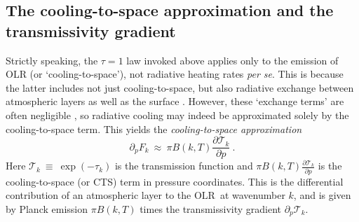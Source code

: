 \documentclass{ametsoc}
\newcommand{\beqn}{\begin{equation}}
\newcommand{\eeqn}{\end{equation}}
\newcommand{\eqnref}[1]{(\ref{#1})}
\newcommand{\partialder}[2]{\ensuremath{\frac{\partial #1}{\partial #2}}}
\newcommand{\ppp}{\ensuremath{\partial_p}}
\newcommand{\cotwo}{\ensuremath{\mathrm{CO_2}}}
\newcommand{\htwo}{\ensuremath{\mathrm{H_2O}}}
\newcommand{\OLR}{\ensuremath{\mathrm{OLR}}}
\newcommand{\trans}{\ensuremath{\mathcal{T}}}
\newcommand{\tauk}{\ensuremath{\tau_k}}
\newcommand{\taumax}{\ensuremath{\tau_{\text{max}}}}
\begin{document}
\subsection{The cooling-to-space approximation and the transmissivity gradient} \label{sec_tau=1}
Strictly speaking, the $\tau=1$ law  invoked above  applies only to the emission of OLR (or `cooling-to-space'), not radiative heating rates \emph{per se}. This is because  the latter includes not just cooling-to-space, but also radiative exchange between atmospheric layers as well as the surface \citep{green1967}. However,  these `exchange terms' are often negligible \citep{jeevanjee2019b,clough1992,rodgers1966}, so radiative cooling may indeed be approximated solely by the cooling-to-space term. This yields the  \emph{cooling-to-space approximation} 
\beqn
	\ppp F_k \ \approx \   \pi B(k,T) \partialder{\trans_k}{p} \  .
	\label{cts}
\eeqn
Here $\trans_k \ \equiv \ \exp(-\tauk)$ is the transmission function and $\pi B(k,T) \partialder{\trans_k}{p}$ is the cooling-to-space (or CTS) term in pressure coordinates. This is  the differential contribution of an atmospheric layer to the \OLR\ at wavenumber $k$, and is given by Planck emission $\pi B(k,T)$ times the transmissivity gradient $\ppp \trans_k$.

 
\end{document}
